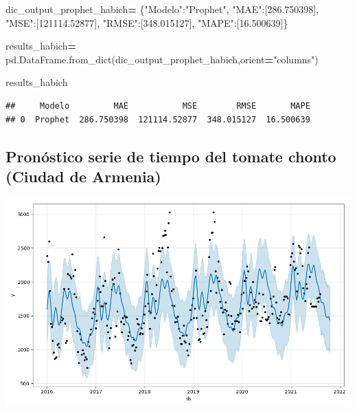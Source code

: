 \documentclass[
]{book}
\newenvironment{Shaded}{\begin{snugshade}}{\end{snugshade}}
\newcommand{\FloatTok}[1]{\textcolor[rgb]{0.00,0.00,0.81}{#1}}
\newcommand{\NormalTok}[1]{#1}
\newcommand{\OperatorTok}[1]{\textcolor[rgb]{0.81,0.36,0.00}{\textbf{#1}}}
\newcommand{\StringTok}[1]{\textcolor[rgb]{0.31,0.60,0.02}{#1}}
\begin{document}
\begin{Shaded}
\begin{Highlighting}[]

\NormalTok{dic\_output\_prophet\_habich}\OperatorTok{=}\NormalTok{ \{}\StringTok{"Modelo"}\NormalTok{:}\StringTok{"Prophet"}\NormalTok{,}
                 \StringTok{"MAE"}\NormalTok{:[}\FloatTok{286.750398}\NormalTok{],}
                 \StringTok{"MSE"}\NormalTok{:[}\FloatTok{121114.52877}\NormalTok{],}
                 \StringTok{"RMSE"}\NormalTok{:[}\FloatTok{348.015127}\NormalTok{],}
                 \StringTok{"MAPE"}\NormalTok{:[}\FloatTok{16.500639}\NormalTok{]\}}

\NormalTok{results\_habich}\OperatorTok{=}\NormalTok{ pd.DataFrame.from\_dict(dic\_output\_prophet\_habich,orient}\OperatorTok{=}\StringTok{"columns"}\NormalTok{)}

\NormalTok{results\_habich}
\end{Highlighting}
\end{Shaded}

\begin{verbatim}
##     Modelo         MAE           MSE        RMSE       MAPE
## 0  Prophet  286.750398  121114.52877  348.015127  16.500639
\end{verbatim}

\hypertarget{pronuxf3stico-serie-de-tiempo-del-tomate-chonto-ciudad-de-armenia-2}{%
\subsection{Pronóstico serie de tiempo del tomate chonto (Ciudad de Armenia)}\label{pronuxf3stico-serie-de-tiempo-del-tomate-chonto-ciudad-de-armenia-2}}

\includegraphics{Prophet_Tomate_AXM.png}
\end{document}
